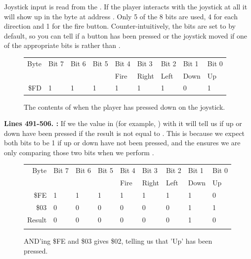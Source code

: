 Joystick input is read from the . If the player interacts with the joystick at all it will
show up in the byte at address . Only 5 of the 8 bits are used, 4 for each direction and 1 for the fire button.
Counter-intuitively, the bits are set to  by default, so you can tell if a button has been pressed or the joystick moved
if one of the appropriate bits is  rather than .

\begin{figure}[H]
  {
    \setlength{\tabcolsep}{3.0pt}
    \setlength\cmidrulewidth{\heavyrulewidth} %
    \begin{adjustbox}{width=7cm,center}

      \begin{tabular}{rllllllll}
        \toprule
        Byte & Bit 7 & Bit 6 & Bit 5 & Bit 4 & Bit 3 & Bit 2 & Bit 1 & Bit 0        \\
             &       &       &       & Fire  & Right & Left  & Down  & Up           \\
        \midrule
        \$FD & 1 & 1 & 1 & 1 & 1 & 1 & 0 & 1 \\
        \bottomrule
      \end{tabular}
    \end{adjustbox}
  }\caption*{The contents of  when the player has pressed down on the joystick.}
\end{figure}

\textbf{Lines 491-506. :} If we  the value in  (for
example, ) with
 it will tell us if up or down have been pressed if the result is not equal to . This is because
we expect both bits to be 1 if up or down have not been pressed, and the  ensures we are only comparing those
two bits when we perform .
\begin{figure}[H]
  {
    \setlength{\tabcolsep}{3.0pt}
    \setlength\cmidrulewidth{\heavyrulewidth} %
    \begin{adjustbox}{width=7cm,center}

      \begin{tabular}{rllllllll}
        \toprule
        Byte & Bit 7 & Bit 6 & Bit 5 & Bit 4 & Bit 3 & Bit 2 & Bit 1 & Bit 0        \\
             &       &       &       & Fire  & Right & Left  & Down  & Up           \\
        \midrule
        \$FE & 1 & 1 & 1 & 1 & 1 & 1 & 1 & 0 \\
        \$03 & 0 & 0 & 0 & 0 & 0 & 0 & 1 & 1 \\
        \midrule
        Result & 0 & 0 & 0 & 0 & 0 & 0 & 1 & 0 \\
        \addlinespace
        \bottomrule
      \end{tabular}
    \end{adjustbox}
    }\caption*{AND'ing \$FE and \$03 gives \$02, telling us that 'Up' has been pressed.}
\end{figure}

